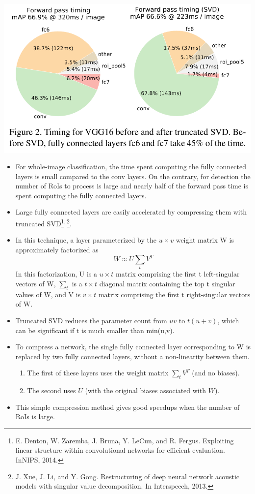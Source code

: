 \documentclass[11pt]{book}
\begin{document}
   \includegraphics[width=.9\linewidth]{./pic_fast_rcnn/2.png}
\begin{itemize}
\item For whole-image classification, the time spent computing the fully connected layers is small 
     compared to the conv layers. On the contrary, for detection the number of RoIs to process is
     large and nearly half of the forward pass time is spent computing the fully connected layers.
\item Large fully connected layers are easily accelerated by compressing them with truncated 
     SVD\footnote{E. Denton, W. Zaremba, J. Bruna, Y. LeCun, and R. Fergus.
Exploiting linear structure within convolutional networks for efficient evaluation. 
InNIPS, 2014.
 }\textsuperscript{,}\,\footnote{J.  Xue,  J.  Li,  and  Y.  Gong.   
Restructuring  of  deep  neural network acoustic models with singular value decomposition.
In Interspeech, 2013.
 }.
\item In this technique, a layer parameterized by the $u\times{v}$ weight matrix W is approximately 
     factorized as
     \begin{equation}
       W\approx{U\sum_tV^T}
     \end{equation}
     In this factorization, U is a $u\times{t}$ matrix comprising the first t left-singular vectors
     of W, $\sum_t$ is a $t\times{t}$ diagonal matrix containing the top t singular values of W,
     and V is $v\times{t}$ matrix comprising the first t right-singular vectors of W.
\item Truncated SVD reduces the parameter count from $uv$ to $t(u+v)$, which can be 
     significant if t is much smaller than min(u,v).
\item To compress a network, the single fully connected layer corresponding to W is replaced
     by two fully connected layers, without a non-linearity between them.
\begin{enumerate}
\item The first of these layers uses the weight matrix $\sum_tV^T$ (and no biases).
\item The second uses $U$ (with the original biases associated with $W$).
\end{enumerate}
\item This simple compression method gives good speedups when the number of RoIs is large.
\end{itemize}
     
\end{document}
